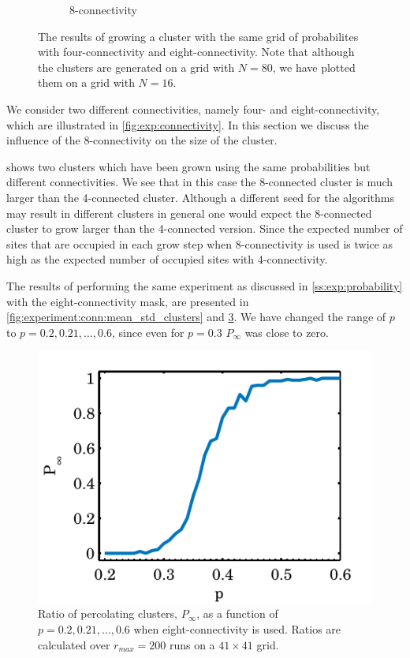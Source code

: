\begin{figure}
\begin{subfigure}{0.45\columnwidth}
		\caption{8-connectivity}
		\label{fig:exp:connectivity:eightConnect}
	\end{subfigure}	
	\caption{The results of growing a cluster with the same grid of probabilites with  four-connectivity and  eight-connectivity. Note that although the clusters are generated on a grid with $N = 80$, we have plotted them on a grid with $N = 16$.}
	\label{fig:exp:connectivityResults}
\end{figure}

We consider two different connectivities, namely four- and eight-connectivity, which are illustrated in \cref{fig:exp:connectivity}. In this section we discuss the influence of the 8-connectivity on the size of the cluster.

 shows two clusters which have been grown using the same probabilities but different connectivities. We see that in this case the 8-connected cluster is much larger than the 4-connected cluster. Although a different seed for the algorithms may result in different clusters in general one would expect the 8-connected cluster to grow larger than the 4-connected version. Since the expected number of sites that are occupied in each grow step when 8-connectivity is used is twice as high as the expected number of occupied sites with 4-connectivity. 

The results of performing the same experiment as discussed in \cref{ss:exp:probability} with the eight-connectivity mask, are presented in \cref{fig:experiment:conn:mean_std_clusters} and \ref{fig:experiment:conn:p_inf_ratio}. We have changed the range of $p$ to $p = 0.2, 0.21, \dotsc, 0.6$, since even for $p = 0.3$ $P_\infty$ was close to zero. 

\begin{figure}%
	\centering
	\includegraphics[width=\columnwidth]{./img/assignment_d_p_infinite_ratio_p.pdf}
	\caption{Ratio of percolating clusters, $P_\infty$, as a function of $p = 0.2, 0.21, \dotsc, 0.6$ when eight-connectivity is used. Ratios are calculated over $r_{max} = 200$ runs on a $41 \times 41$ grid.}
	\label{fig:experiment:conn:p_inf_ratio}
\end{figure}


